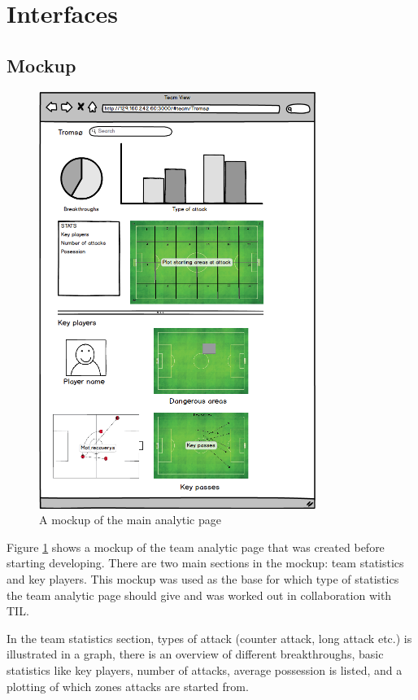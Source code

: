 \section{Interfaces}

\subsection{Mockup}

\begin{figure}[ht!]
\centering
\includegraphics[width=90mm]{images/general/mockup.png}
\caption{A mockup of the main analytic page}
\label{fig:mockup}
\end{figure}

Figure \ref{fig:mockup} shows a mockup of the team analytic page that was created before starting developing. There are two main sections in the mockup: team statistics and key players. This mockup was used as the base for which type of statistics the team analytic page should give and was worked out in collaboration with \ac{TIL}.

In the team statistics section, types of attack (counter attack, long attack etc.) is illustrated in a graph, there is an overview of different breakthroughs, basic statistics like key players, number of attacks, average possession is listed, and a plotting of which zones attacks are started from.

